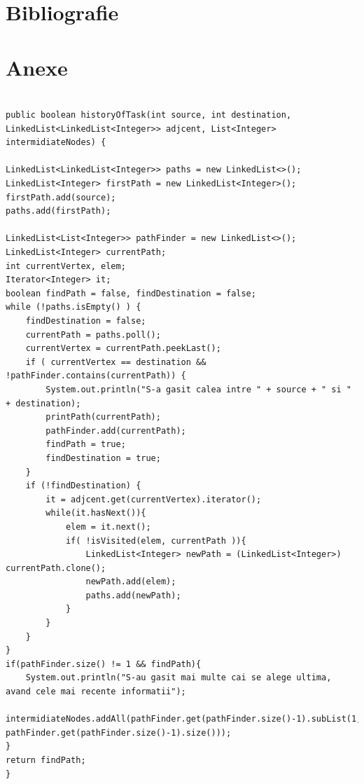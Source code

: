\documentclass[12pt,a4paper]{report}
\begin{document}
\chapter{Bibliografie} \label{bibliografie}





\chapter{Anexe} \label{anexe}
\newlength\someheight
\setlength\someheight{3cm}

\begin{lstlisting}[label={alg:historyOfTask},caption={Calea parcursă de un task până la destinație}]

public boolean historyOfTask(int source, int destination, LinkedList<LinkedList<Integer>> adjcent, List<Integer> intermidiateNodes) {

LinkedList<LinkedList<Integer>> paths = new LinkedList<>();	
LinkedList<Integer> firstPath = new LinkedList<Integer>();
firstPath.add(source);
paths.add(firstPath);
		
LinkedList<List<Integer>> pathFinder = new LinkedList<>();	
LinkedList<Integer> currentPath;
int currentVertex, elem;
Iterator<Integer> it;
boolean findPath = false, findDestination = false;
while (!paths.isEmpty() ) {
	findDestination = false;
	currentPath = paths.poll();
	currentVertex = currentPath.peekLast();
	if ( currentVertex == destination && !pathFinder.contains(currentPath)) {
		System.out.println("S-a gasit calea intre " + source + " si " + destination);
		printPath(currentPath);
		pathFinder.add(currentPath);
		findPath = true;
		findDestination = true;
	}
	if (!findDestination) {
		it = adjcent.get(currentVertex).iterator();		
		while(it.hasNext()){
			elem = it.next();
			if( !isVisited(elem, currentPath )){
				LinkedList<Integer> newPath = (LinkedList<Integer>) currentPath.clone();
				newPath.add(elem);
				paths.add(newPath);
			}
		}
	}
}
if(pathFinder.size() != 1 && findPath){
	System.out.println("S-au gasit mai multe cai se alege ultima, avand cele mai recente informatii");
	intermidiateNodes.addAll(pathFinder.get(pathFinder.size()-1).subList(1, pathFinder.get(pathFinder.size()-1).size()));
}	
return findPath;
}
\end{lstlisting}
\end{document}
